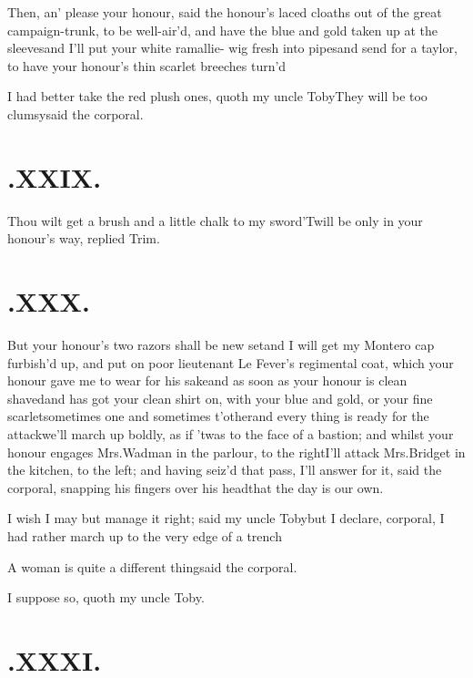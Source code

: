 \documentclass{article}
\begin{document}
Then, an’ please your honour, said the\break
{}
honour’s laced cloaths out of the great campaign-trunk, to be
well-air’d, and have the blue and gold taken up at the
sleeves\tsk and I’ll put your white ramallie-
wig fresh into
pipes\tsk and send for a taylor, to have your honour’s thin
scarlet breeches turn’d\tsh

\tsh I had better take the red plush ones,\break
quoth my uncle Toby\tsk They will be\break
too clumsy\tsk said the corporal.

\section{.\enspace XXIX.}

\quad\tsh Thou wilt get a brush and a little chalk to my
sword\tsh ’Twill be only in your honour’s way,
replied Trim.

\section{.\enspace XXX.}

\quad\tsk But your honour’s two razors shall be new
set\tsk and I will get my Montero cap furbish’d up,
and put on poor lieutenant Le Fever’s regimental coat,
which your honour gave me to
wear for his sake\tsk and as soon as your honour is clean
shaved\tsk and has got your clean shirt on, with your blue and
gold, or your fine scarlet\tsh sometimes one and sometimes
t’other\tsk and every thing is ready for the attack\tsk we’ll
march up boldly, as if ’twas to the face of a bastion; and
whilst your honour engages Mrs.\@  Wadman in the parlour, to the
right\tsh I’ll attack Mrs.\@ Bridget in the kitchen, to the
left; and having seiz’d that pass, I’ll answer for it, said the
corporal, snapping his fingers over his head\break\tsk that the
day is our own.

I wish I may but manage it right; said my uncle
Toby\tsk but I declare, corporal, I had rather march up to
the very edge of a trench\tsh{}

\tsk A woman is quite a different thing\break\tsk said the
corporal.

\tsk I suppose so, quoth my uncle Toby.

\section{.\enspace XXXI.}
\end{document}

